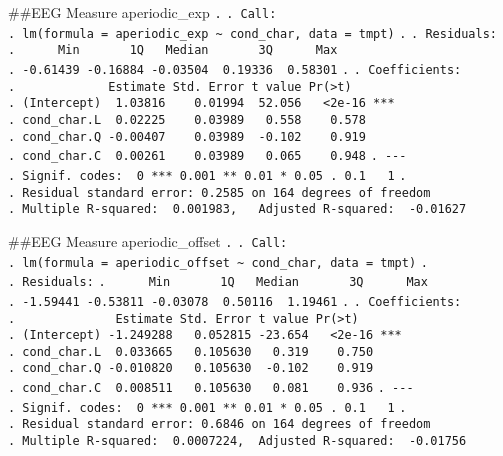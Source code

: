 \documentclass[
]{article}
\begin{document}
\#\#EEG Measure aperiodic\_exp \texttt{.} \texttt{.\ Call:}
\texttt{.\ lm(formula\ =\ aperiodic\_exp\ \textasciitilde{}\ cond\_char,\ data\ =\ tmpt)}
\texttt{.} \texttt{.\ Residuals:}
\texttt{.\ \ \ \ \ \ Min\ \ \ \ \ \ \ 1Q\ \ \ Median\ \ \ \ \ \ \ 3Q\ \ \ \ \ \ Max}
\texttt{.\ -0.61439\ -0.16884\ -0.03504\ \ 0.19336\ \ 0.58301}
\texttt{.} \texttt{.\ Coefficients:}
\texttt{.\ \ \ \ \ \ \ \ \ \ \ \ \ Estimate\ Std.\ Error\ t\ value\ Pr(\textgreater{}\textbar{}t\textbar{})}
\texttt{.\ (Intercept)\ \ 1.03816\ \ \ \ 0.01994\ \ 52.056\ \ \ \textless{}2e-16\ ***}
\texttt{.\ cond\_char.L\ \ 0.02225\ \ \ \ 0.03989\ \ \ 0.558\ \ \ \ 0.578}
\texttt{.\ cond\_char.Q\ -0.00407\ \ \ \ 0.03989\ \ -0.102\ \ \ \ 0.919}
\texttt{.\ cond\_char.C\ \ 0.00261\ \ \ \ 0.03989\ \ \ 0.065\ \ \ \ 0.948}
\texttt{.\ -\/-\/-}
\texttt{.\ Signif.\ codes:\ \ 0\ \textquotesingle{}***\textquotesingle{}\ 0.001\ \textquotesingle{}**\textquotesingle{}\ 0.01\ \textquotesingle{}*\textquotesingle{}\ 0.05\ \textquotesingle{}.\textquotesingle{}\ 0.1\ \textquotesingle{}\ \textquotesingle{}\ 1}
\texttt{.}
\texttt{.\ Residual\ standard\ error:\ 0.2585\ on\ 164\ degrees\ of\ freedom}
\texttt{.\ Multiple\ R-squared:\ \ 0.001983,\ \ \ Adjusted\ R-squared:\ \ -0.01627}

\#\#EEG Measure aperiodic\_offset \texttt{.} \texttt{.\ Call:}
\texttt{.\ lm(formula\ =\ aperiodic\_offset\ \textasciitilde{}\ cond\_char,\ data\ =\ tmpt)}
\texttt{.} \texttt{.\ Residuals:}
\texttt{.\ \ \ \ \ \ Min\ \ \ \ \ \ \ 1Q\ \ \ Median\ \ \ \ \ \ \ 3Q\ \ \ \ \ \ Max}
\texttt{.\ -1.59441\ -0.53811\ -0.03078\ \ 0.50116\ \ 1.19461}
\texttt{.} \texttt{.\ Coefficients:}
\texttt{.\ \ \ \ \ \ \ \ \ \ \ \ \ \ Estimate\ Std.\ Error\ t\ value\ Pr(\textgreater{}\textbar{}t\textbar{})}
\texttt{.\ (Intercept)\ -1.249288\ \ \ 0.052815\ -23.654\ \ \ \textless{}2e-16\ ***}
\texttt{.\ cond\_char.L\ \ 0.033665\ \ \ 0.105630\ \ \ 0.319\ \ \ \ 0.750}
\texttt{.\ cond\_char.Q\ -0.010820\ \ \ 0.105630\ \ -0.102\ \ \ \ 0.919}
\texttt{.\ cond\_char.C\ \ 0.008511\ \ \ 0.105630\ \ \ 0.081\ \ \ \ 0.936}
\texttt{.\ -\/-\/-}
\texttt{.\ Signif.\ codes:\ \ 0\ \textquotesingle{}***\textquotesingle{}\ 0.001\ \textquotesingle{}**\textquotesingle{}\ 0.01\ \textquotesingle{}*\textquotesingle{}\ 0.05\ \textquotesingle{}.\textquotesingle{}\ 0.1\ \textquotesingle{}\ \textquotesingle{}\ 1}
\texttt{.}
\texttt{.\ Residual\ standard\ error:\ 0.6846\ on\ 164\ degrees\ of\ freedom}
\texttt{.\ Multiple\ R-squared:\ \ 0.0007224,\ \ Adjusted\ R-squared:\ \ -0.01756}
\end{document}
